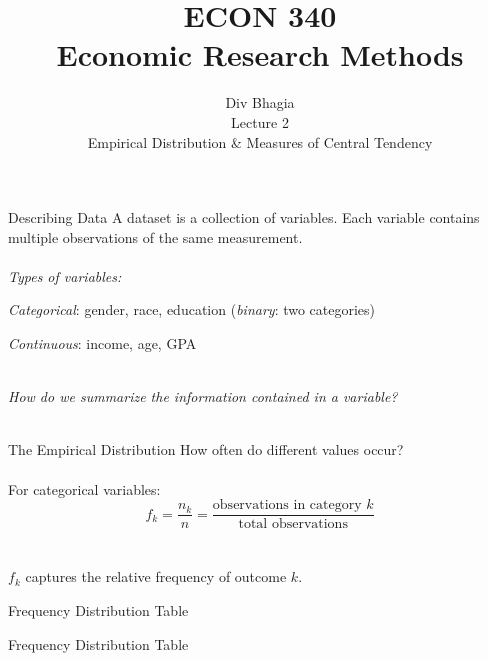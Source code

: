 \documentclass{./../div_teaching_slides}
\begin{document}
\title{ECON 340 \\ Economic Research Methods}
\author{Div Bhagia \\\vspace{1.75em}
Lecture 2 \\\vspace{0.25em} \small Empirical Distribution \& Measures of Central Tendency}
\date{}

\begin{frame}
\maketitle
\end{frame}


\begin{frame}{Describing Data}
A dataset is a collection of variables. Each variable contains multiple observations of the same measurement. \\~\\
\textit{Types of variables:} \\
\begin{witemize}
\item \textit{Categorical}: gender, race, education (\textit{binary}: two categories) 
\item \textit{Continuous}: income, age, GPA \\~\\
\end{witemize}
\textit{How do we summarize the information contained in a variable?} \\~\\
\end{frame}

\begin{frame}{The Empirical Distribution}
How often do different values occur? \\~\\
For categorical variables:
$$ f_k = \frac{n_k}{n}= \frac{\text{observations in category $k$}}{\text{total observations}} $$ \\~\\
$f_k$ captures the relative frequency of outcome $k$. 
\end{frame}

\begin{frame}{Frequency Distribution Table}

\end{frame}

\begin{frame}{Frequency Distribution Table}

\end{frame}
\end{document}
